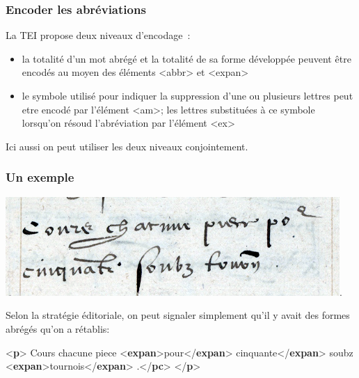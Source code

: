 \documentclass[]{beamer}\makeatletter
\begin{document}
\begin{frame}
\frametitle{Encoder les abréviations}\par
La TEI propose deux niveaux d’encodage : \begin{itemize}

\item la totalité d’un mot abrégé et la totalité de sa forme        développée peuvent être encodés au moyen des éléments         {\color{blue2}<abbr>} et {\color{blue2}<expan>}
\item le symbole utilisé pour indiquer la suppression d’une ou        plusieurs lettres peut etre encodé par l'élément {\color{blue2}<am>}; les        lettres substituées à ce symbole lorsqu’on résoud l’abréviation        par l'élément {\color{blue2}<ex>}
\end{itemize} Ici aussi on peut utiliser les deux niveaux conjointement.
\end{frame}

\begin{frame}[fragile]
\frametitle{Un exemple}\par
\includegraphics[width=360pt,]{../Graphics/Ms629_p05-dtl-1.png}. \par
Selon la stratégie éditoriale, on peut signaler simplement qu'il y      avait des formes abrégés qu'on a rétablis: 
\bgroup\ttfamily\fontsize{8.5pt}{9pt}\selectfont\par
\begin{exampleblock}{}
\noindent\ttfamily\mbox{}{\color{blue1}<\textbf{p}>}\mbox{}\newline 
{}Cours chacune piece {\color{blue1}<\textbf{expan}>}pour{\color{blue1}</\textbf{expan}>}\mbox{}\newline 
{}\mbox{}\newline 
{}cinquante{\color{blue1}</\textbf{expan}>} soubz\mbox{}\newline 
{\color{blue1}<\textbf{expan}>}tournois{\color{blue1}</\textbf{expan}>}\mbox{}\newline 
{}.{\color{blue1}</\textbf{pc}>}\mbox{}\newline 
{\color{blue1}</\textbf{p}>}
\end{exampleblock}
\par\egroup
  
\end{frame}
\end{document}

